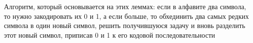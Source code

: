 \documentclass[discrete.tex]{subfiles}
\begin{document}
\begin{sol}
    Алгоритм, который основывается на этих леммах: если в алфавите два символа, то нужно закодировать их 0 и 1, а если больше, то обхединить два самых редких символа в один новый символ, решить получившуюся задачу и вновь разделить этот новый символ, приписав 0 и 1 к его кодовой последовательности
  \end{sol}
\end{document}
